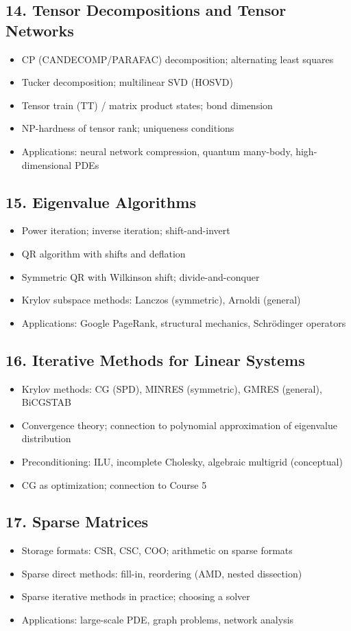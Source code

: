 \subsection{14. Tensor Decompositions and Tensor Networks}
\begin{itemize}
\item CP (CANDECOMP/PARAFAC) decomposition; alternating least squares
\item Tucker decomposition; multilinear SVD (HOSVD)
\item Tensor train (TT) / matrix product states; bond dimension
\item NP-hardness of tensor rank; uniqueness conditions
\item Applications: neural network compression, quantum many-body, high-dimensional PDEs
\end{itemize}

\subsection{15. Eigenvalue Algorithms}
\begin{itemize}
\item Power iteration; inverse iteration; shift-and-invert
\item QR algorithm with shifts and deflation
\item Symmetric QR with Wilkinson shift; divide-and-conquer
\item Krylov subspace methods: Lanczos (symmetric), Arnoldi (general)
\item Applications: Google PageRank, structural mechanics, Schr\"odinger operators
\end{itemize}

\subsection{16. Iterative Methods for Linear Systems}
\begin{itemize}
\item Krylov methods: CG (SPD), MINRES (symmetric), GMRES (general), BiCGSTAB
\item Convergence theory; connection to polynomial approximation of eigenvalue distribution
\item Preconditioning: ILU, incomplete Cholesky, algebraic multigrid (conceptual)
\item CG as optimization; connection to Course 5
\end{itemize}

\subsection{17. Sparse Matrices}
\begin{itemize}
\item Storage formats: CSR, CSC, COO; arithmetic on sparse formats
\item Sparse direct methods: fill-in, reordering (AMD, nested dissection)
\item Sparse iterative methods in practice; choosing a solver
\item Applications: large-scale PDE, graph problems, network analysis
\end{itemize}

